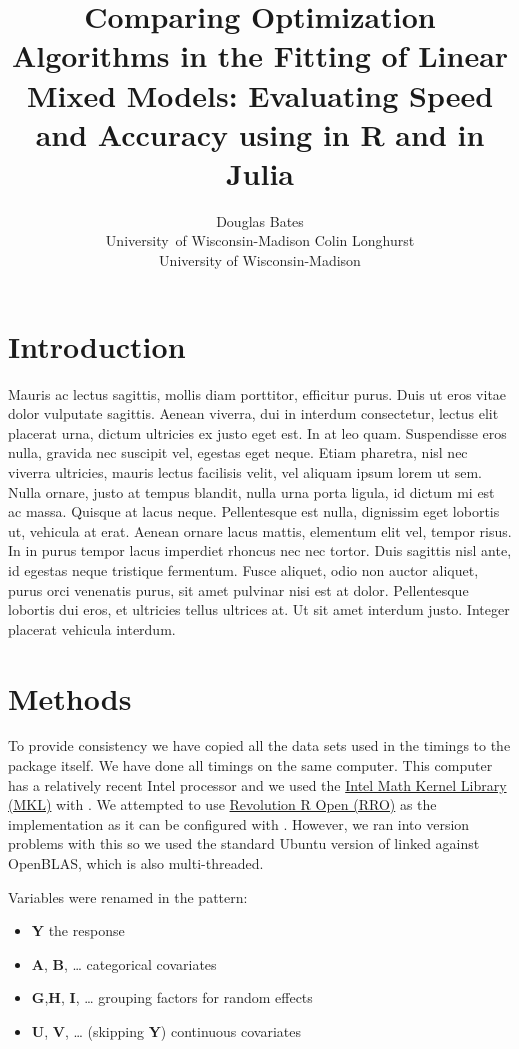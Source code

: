 \documentclass[article]{jss}
\author{Douglas Bates\\University\ of Wisconsin-Madison \And 
        Colin Longhurst \\University of Wisconsin-Madison}
\title{Comparing Optimization Algorithms in the Fitting of Linear Mixed Models: Evaluating Speed and Accuracy using \pkg{lme4} in R and \pkg{lmm} in Julia}
\begin{document}

\section[Introduction]{Introduction}



Mauris ac lectus sagittis, mollis diam porttitor, efficitur purus. Duis ut eros vitae dolor vulputate sagittis. Aenean viverra, dui in interdum consectetur, lectus elit placerat urna, dictum ultricies ex justo eget est. In at leo quam. Suspendisse eros nulla, gravida nec suscipit vel, egestas eget neque. Etiam pharetra, nisl nec viverra ultricies, mauris lectus facilisis velit, vel aliquam ipsum lorem ut sem. Nulla ornare, justo at tempus blandit, nulla urna porta ligula, id dictum mi est ac massa. Quisque at lacus neque. Pellentesque est nulla, dignissim eget lobortis ut, vehicula at erat. Aenean ornare lacus mattis, elementum elit vel, tempor risus. In in purus tempor lacus imperdiet rhoncus nec nec tortor. Duis sagittis nisl ante, id egestas neque tristique fermentum. Fusce aliquet, odio non auctor aliquet, purus orci venenatis purus, sit amet pulvinar nisi est at dolor. Pellentesque lobortis dui eros, et ultricies tellus ultrices at. Ut sit amet interdum justo. Integer placerat vehicula interdum. 


\section[Methods]{Methods}


To provide consistency we have copied all the data sets used in the
timings to the  package itself. We have done all timings
on the same computer. This computer has a relatively recent Intel
processor and we used the
\href{https://software.intel.com/en-us/intel-mkl}{Intel Math Kernel
Library (MKL)} with . We attempted to use
\href{www.revolutionanalytics.com/revolution-r-open}{Revolution R Open
(RRO)} as the  implementation as it can be configured with .
However, we ran into version problems with this so we used the standard
Ubuntu version of  linked against OpenBLAS, which is also
multi-threaded.

Variables were renamed in the pattern: 

\begin{itemize}
\item \textbf{Y} the response 
\item \textbf{A}, \textbf{B}, \dots{} categorical covariates 
\item \textbf{G},\textbf{H}, \textbf{I}, \dots{} grouping factors for random effects 
\item \textbf{U}, \textbf{V}, \dots{} (skipping \textbf{Y}) continuous covariates
\end{itemize}
\end{document}
